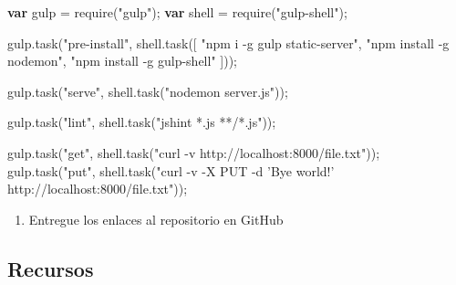 \documentclass[]{article}
\newenvironment{Shaded}{}{}
\newcommand{\AttributeTok}[1]{\textcolor[rgb]{0.49,0.56,0.16}{#1}}
\newcommand{\KeywordTok}[1]{\textcolor[rgb]{0.00,0.44,0.13}{\textbf{#1}}}
\newcommand{\NormalTok}[1]{#1}
\newcommand{\OperatorTok}[1]{\textcolor[rgb]{0.40,0.40,0.40}{#1}}
\newcommand{\StringTok}[1]{\textcolor[rgb]{0.25,0.44,0.63}{#1}}
\newcommand{\VariableTok}[1]{\textcolor[rgb]{0.10,0.09,0.49}{#1}}
\providecommand{\tightlist}{%
  \setlength{\itemsep}{0pt}\setlength{\parskip}{0pt}}
\begin{document}
\begin{Shaded}
\begin{Highlighting}[]
\KeywordTok{var}\NormalTok{ gulp }\OperatorTok{=} \AttributeTok{require}\NormalTok{(}\StringTok{"gulp"}\NormalTok{)}\OperatorTok{;}
\KeywordTok{var}\NormalTok{ shell }\OperatorTok{=} \AttributeTok{require}\NormalTok{(}\StringTok{"gulp-shell"}\NormalTok{)}\OperatorTok{;}

\VariableTok{gulp}\NormalTok{.}\AttributeTok{task}\NormalTok{(}\StringTok{"pre-install"}\OperatorTok{,} \VariableTok{shell}\NormalTok{.}\AttributeTok{task}\NormalTok{([}
      \StringTok{"npm i -g gulp static-server"}\OperatorTok{,}
      \StringTok{"npm install -g nodemon"}\OperatorTok{,}
      \StringTok{"npm install -g gulp-shell"}
\NormalTok{]))}\OperatorTok{;}

\VariableTok{gulp}\NormalTok{.}\AttributeTok{task}\NormalTok{(}\StringTok{"serve"}\OperatorTok{,} \VariableTok{shell}\NormalTok{.}\AttributeTok{task}\NormalTok{(}\StringTok{"nodemon server.js"}\NormalTok{))}\OperatorTok{;}

\VariableTok{gulp}\NormalTok{.}\AttributeTok{task}\NormalTok{(}\StringTok{"lint"}\OperatorTok{,} \VariableTok{shell}\NormalTok{.}\AttributeTok{task}\NormalTok{(}\StringTok{"jshint *.js **/*.js"}\NormalTok{))}\OperatorTok{;}

\VariableTok{gulp}\NormalTok{.}\AttributeTok{task}\NormalTok{(}\StringTok{"get"}\OperatorTok{,} \VariableTok{shell}\NormalTok{.}\AttributeTok{task}\NormalTok{(}\StringTok{"curl -v http://localhost:8000/file.txt"}\NormalTok{))}\OperatorTok{;}
\VariableTok{gulp}\NormalTok{.}\AttributeTok{task}\NormalTok{(}\StringTok{"put"}\OperatorTok{,} \VariableTok{shell}\NormalTok{.}\AttributeTok{task}\NormalTok{(}\StringTok{"curl -v -X PUT -d 'Bye world!' http://localhost:8000/file.txt"}\NormalTok{))}\OperatorTok{;}

\end{Highlighting}
\end{Shaded}

\begin{enumerate}
\def\labelenumi{\arabic{enumi}.}
\setcounter{enumi}{5}
\tightlist
\item
  Entregue los enlaces al repositorio en GitHub
\end{enumerate}

\hypertarget{recursos}{%
\subsection{Recursos}\label{recursos}}
\end{document}
